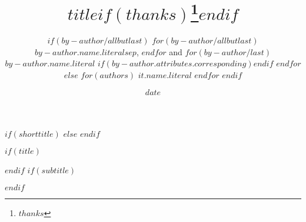 

$if(shorttitle)$
$else$
$endif$

$if(title)$
\title{$title$$if(thanks)$\thanks{$thanks$}$endif$}
$endif$
$if(subtitle)$
\usepackage{etoolbox}
\makeatletter
\providecommand{\subtitle}[1]{%
  \apptocmd{\@title}{\par {\large #1 \par}}{}{}
}
\makeatother
\subtitle{$subtitle$}
$endif$

\author{
$if(by-author/allbutlast)$
$for(by-author/allbutlast)$
$by-author.name.literal$$sep$,
$endfor$
 and 
$for(by-author/last)$
$by-author.name.literal$
$if(by-author.attributes.corresponding)$\corrauth$endif$
$endfor$
$else$
$for(authors)$
$it.name.literal$
$endfor$
$endif$
}

\address{
$if(authors/allbutlast)$
$for(affiliations)$
 $if(it.department)$$it.department$, $endif$$it.name$$if(it.address)$, $it.address$$endif$$sep$\break
$endfor$
$else$
$for(affiliations)$
$it.name$$sep$\break
$endfor$
$endif$\\
\hspace*{1ex} Email: $for(authors)$$if(authors.attributes.corresponding)$\texttt{$authors.email$}$endif$$sep$ $endfor$
}


\date{$date$}
